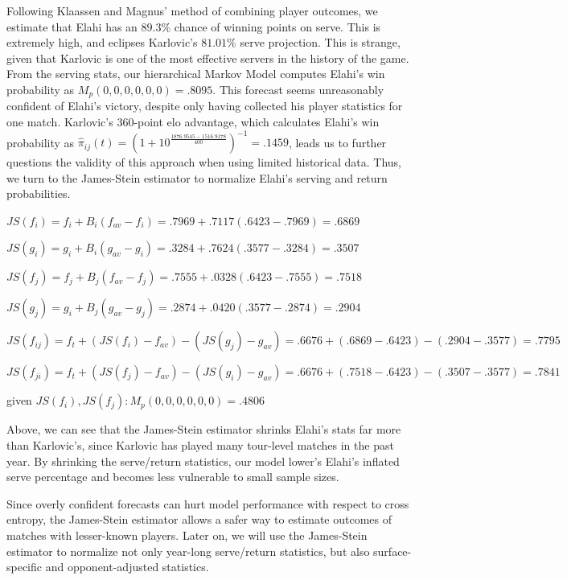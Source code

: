\documentclass[chapterprefix=false]{report}
\begin{document}
Following Klaassen and Magnus' method of combining player outcomes, we estimate that Elahi has an $89.3\%$ chance of winning points on serve. This is extremely high, and eclipses Karlovic's $81.01\%$ serve projection. This is strange, given that Karlovic is one of the most effective servers in the history of the game. From the serving stats, our hierarchical Markov Model computes Elahi's win probability as $M_p(0,0,0,0,0,0) = .8095$. This forecast seems unreasonably confident of Elahi's victory, despite only having collected his player statistics for one match. Karlovic's 360-point elo advantage, which calculates Elahi's win probability as $\hat{\pi}_{ij}(t) = (1+10^\frac{1876.9545 - 1516.9178}{400})^{-1} = .1459$, leads us to further questions the validity of this approach when using limited historical data. Thus, we turn to the James-Stein estimator to normalize Elahi's serving and return probabilities.

\begin{center}
$JS(f_i) = f_i + B_i(f_{av}-f_i) = .7969 + .7117(.6423-.7969) = .6869$

$JS(g_i) = g_i + B_i(g_{av}-g_i) = .3284 + .7624(.3577-.3284) = .3507$

$JS(f_j) = f_j + B_j(f_{av}-f_j) = .7555 + .0328(.6423-.7555) = .7518$

$JS(g_j) = g_i + B_j(g_{av}-g_j) = .2874 + .0420(.3577-.2874) = .2904$

$JS(f_{ij}) = f_t + (JS(f_i)-f_{av})-(JS(g_j)-g_{av}) = .6676 + (.6869-.6423) - (.2904-.3577) = .7795$

$JS(f_{ji}) = f_t + (JS(f_j)-f_{av})-(JS(g_i)-g_{av}) = .6676 + (.7518-.6423) - (.3507-.3577) = .7841$

\end{center}

given $JS(f_i),JS(f_j): M_p(0,0,0,0,0,0) = .4806$

Above, we can see that the James-Stein estimator shrinks Elahi's stats far more than Karlovic's, since Karlovic has played many tour-level matches in the past year. By shrinking the serve/return statistics, our model lower's Elahi's inflated serve percentage and becomes less vulnerable to small sample sizes.

Since overly confident forecasts can hurt model performance with respect to cross entropy, the James-Stein estimator allows a safer way to estimate outcomes of matches with lesser-known players. Later on, we will use the James-Stein estimator to normalize not only year-long serve/return statistics, but also surface-specific and opponent-adjusted statistics.
\end{document}
